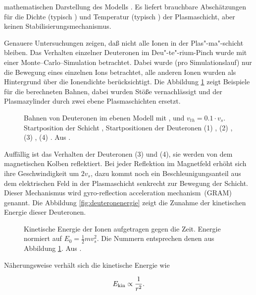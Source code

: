 mathematischen Darstellung des Modells \cite{deutsch:86}. Es liefert
brauchbare Abschätzungen für die Dichte (typisch ) und Temperatur (typisch ) der
Plasmaschicht, aber keinen Stabilisierungsmechanismus.
\par
Genauere Untersuchungen \cite{deutsch:87} zeigen, daß nicht alle
Ionen in der Plas"-ma"-schicht bleiben. Das Verhalten einzelner
Deuteronen im Deu"-te"-rium-Pinch wurde mit einer
Monte--Carlo--Simulation betrachtet. Dabei wurde (pro
Simulationslauf) nur die Bewegung eines einzelnen Ions betrachtet,
alle anderen Ionen wurden als Hintergrund über die Ionendichte
berücksichtigt. Die Abbildung \ref{fig:deuteronbahnen} zeigt
Beispiele für die berechneten Bahnen, dabei wurden Stöße
vernachlässigt und der Plasmazylinder durch zwei ebene
Plasmaschichten ersetzt.
%
\par
\begin{figure}[H]
  \center
  \caption{Bahnen von Deuteronen im ebenen Modell mit ,
   und $v_{th}=0.1 \cdot v_s$. Startposition der
  Schicht , Startpositionen der Deuteronen (1)
  , (2) , (3) ,
  (4) . Aus \cite{deutsch:87}.}
  \label{fig:deuteronbahnen}
\end{figure}
%
\par
Auffällig ist das Verhalten der Deuteronen (3) und (4), sie werden von
dem magnetischen Kolben reflektiert. Bei jeder Reflektion im Magnetfeld
erhöht sich ihre Geschwindigkeit um $2v_s$, dazu kommt noch ein
Beschleunigungsanteil aus dem elektrischen Feld in der Plasmaschicht
senkrecht zur Bewegung der Schicht. Dieser Mechanismus wird \glqq
gyro-reflection acceleration mechanism\grqq\ (GRAM) genannt. Die
Abbildung \vref{fig:deuteronenergie} zeigt die Zunahme der kinetischen
Energie dieser Deuteronen.
%
\par
\begin{figure}[H]
  \center
  \caption{Kinetische Energie der Ionen aufgetragen gegen die Zeit.
  Energie normiert auf $E_0=\frac{1}{2}mv_s^2$. Die Nummern entsprechen
  denen aus Abbildung \ref{fig:deuteronbahnen}.
  Aus \cite{deutsch:87}.}
  \label{fig:deuteronenergie}
\end{figure}
%
\par
Näherungsweise verhält sich die kinetische Energie wie
\par
$$ E_{\rm kin}\propto \frac{1}{r^2}. $$
\par
